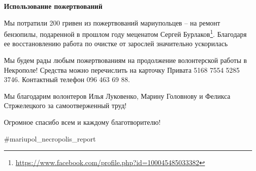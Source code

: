 \textbf{Использование пожертвований}

Мы потратили 200 гривен из пожертвований мариупольцев – на ремонт бензопилы,
подаренной в прошлом году меценатом Сергей Бурлаков\footnote{\url{https://www.facebook.com/profile.php?id=100045485033382}}. Благодаря ее
восстановлению работа по очистке от зарослей значительно ускорилась 🙂

Мы будем рады любым пожертвованиям на продолжение волонтерской работы в
Некрополе! Средства можно перечислить на карточку Привата 5168 7554 5285 3746.
Контактный телефон 096 463 69 88.

Мы благодарим волонтеров Илья Луковенко, Марину Головнову и Феликса
Стржелецкого за самоотверженный труд!

Огромное спасибо всем и каждому благотворителю!

\#mariupol\_necropolis\_report

